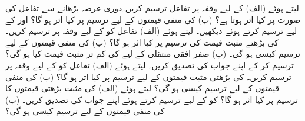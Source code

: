  \quad
{} لیتے ہوئے (الف)  کے لیے وقفہ  پر تفاعل ترسیم کریں۔دوری عرصہ بڑھانے سے تفاعل کی صورت پر کیا اثر ہوتا ہے؟  (ب)   کی منفی قیمتوں کے لیے ترسیم پر کیا اثر ہو گا؟  اور  کے لیے ترسیم کرتے ہوئے دیکھیں۔
\quad
{} لیتے ہوئے (الف) تفاعل  کو  کے لیے وقفہ  پر ترسیم کریں۔  کی بڑھتے مثبت قیمت کی ترسیم پر کیا اثر ہو گا؟  (ب)  کی منفی قیمتوں کے لیے ترسیم کیسی ہو گی۔ (پ)  صفر افقی منتقلی کے لیے  کی کم تر مثبت قیمت کیا ہو گی؟ترسیم کر کے اپنے جواب کی تصدیق کریں۔
\quad
{} لیتے ہوئے (الف) تفاعل  کو  کے لیے وقفہ  پر ترسیم کریں۔ کی بڑھتی مثبت قیمتوں کے لیے ترسیم پر کیا اثر ہو گا؟ (ب)  کی منفی قیمتوں کے لیے ترسیم کیسی ہو گی؟
\quad
{} لیتے ہوئے (الف)  کی مثبت بڑھتی قیمتوں کا ترسیم پر کیا اثر ہو گا؟  کو  کے لیے ترسیم کرتے ہوئے اپنے جواب کی تصدیق کریں۔ (ب)  کی منفی قیمتوں کے لیے ترسیم کیسی ہو گی؟ 

